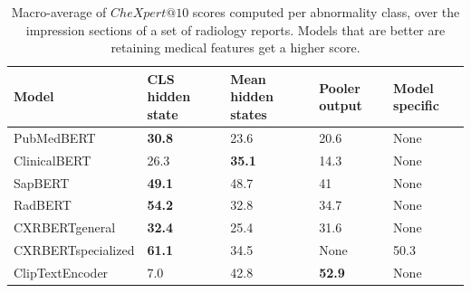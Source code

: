 \documentclass{article}
\begin{document}
\begin{table}
  \caption{Macro-average of $CheXpert@10$ scores computed per abnormality class, over the impression sections of a set of radiology reports. Models that are better are retaining medical features get a higher score.}
  \label{text-encoder-how-to-embed}
  \centering
  \begin{tabular}{lllll}
    \toprule
    Model     
    & CLS hidden state
    & Mean hidden states
    & Pooler output
    & Model specific\\
    \midrule
    PubMedBERT
    & \textbf{30.8}
    & 23.6
    & 20.6
    & None\\
    ClinicalBERT
    & 26.3
    & \textbf{35.1}
    & 14.3
    & None\\
    SapBERT
    & \textbf{49.1}
    & 48.7
    & 41
    & None\\
    RadBERT
    & \textbf{54.2}
    & 32.8
    & 34.7
    & None \\
    CXRBERTgeneral
    & \textbf{32.4}
    & 25.4
    & 31.6
    & None\\
    CXRBERTspecialized
    & \textbf{61.1}
    & 34.5
    & None
    & 50.3\\
    ClipTextEncoder
    & 7.0
    & 42.8
    & \textbf{52.9}
    & None\\
    \bottomrule
  \end{tabular}
\end{table}
\end{document}
